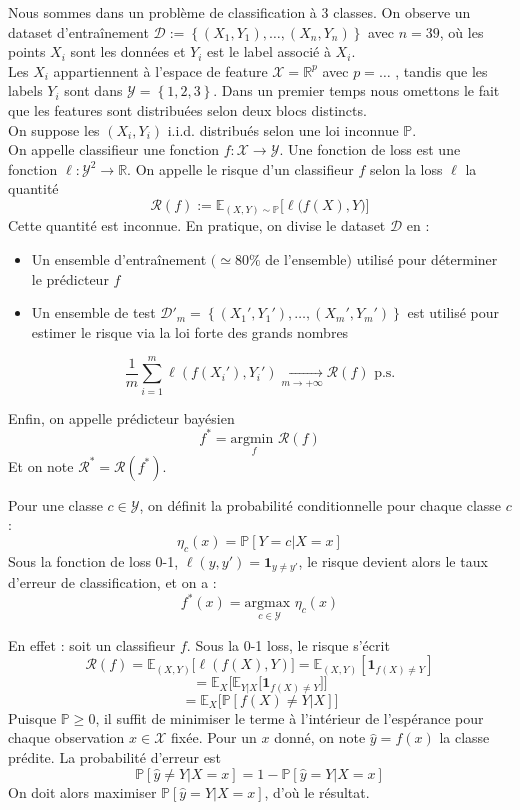 \documentclass[a4paper,11pt]{paper}
\theoremstyle{plain}
\theoremstyle{definition}
\theoremstyle{remark}
\begin{document}
Nous sommes dans un problème de classification à 3 classes. On observe un dataset d'entraînement $\mathcal{D} := \left\{ (X_1, Y_1), \dots, (X_n, Y_n)\right\}$ avec $n = 39$, où les points $X_i$ sont les données et $Y_i$ est le label associé à $X_i$. \\ Les $X_i$ appartiennent à l'espace de feature $\mathcal X = \mathbb R^p$ avec $p = \dots $ , tandis que les labels $Y_i$ sont dans $\mathcal Y = \left\{1, 2, 3\right\}$. Dans un premier temps nous omettons le fait que les features sont distribuées selon deux blocs distincts. \\
On suppose les $(X_i, Y_i)$ i.i.d. distribués selon une loi inconnue $\mathbb P$. \\
On appelle classifieur une fonction $f  : \mathcal X \to \mathcal Y$. Une fonction de loss est une fonction $\ell : \mathcal Y^2 \to \mathbb R$. On appelle le risque d'un classifieur $f$ selon la loss $\ell$ la quantité
$$\mathcal R(f) := \mathbb E_{(X, Y) \sim \mathbb P} \big[ \ell \big(f(X), Y\big)\big]$$
Cette quantité est inconnue. En pratique, on divise le dataset $\mathcal D$ en :
\begin{itemize}
    \item Un ensemble d'entraînement $(\simeq 80\%$ de l'ensemble$)$ utilisé pour déterminer le prédicteur $f$
    \item Un ensemble de test $\mathcal{D}'_m = \left\{ (X_1', Y_1'), \dots, (X_m', Y_m')\right\}$ est utilisé pour estimer le risque via la loi forte des grands nombres
\end{itemize}
$$\dfrac{1}{m}\sum_{i=1}^m\ell(f(X_i'), Y_i') \underset{m \to +\infty }{\longrightarrow} \mathcal{R}(f) \text{ p.s.}$$

Enfin, on appelle prédicteur bayésien
$$f^* = \underset{f}{\text{argmin }} \mathcal R(f)$$
Et on note $\mathcal R^* = \mathcal R(f^*)$.

Pour une classe $c \in \mathcal Y$, on définit la probabilité conditionnelle pour chaque classe $c$ :
$$\eta_c(x)  = \mathbb P[Y = c |X = x]$$
Sous la fonction de loss 0-1, $\ell(y, y') = \mathbf 1_{y \ne y'}$, le risque devient alors le taux d'erreur de classification, et on a :
$$f^*(x) = \underset{c \in \mathcal Y}{\text{argmax }} \eta_c(x)$$

En effet : soit un classifieur $f$. Sous la 0-1 loss, le risque s'écrit
$$\mathcal R(f) = \mathbb E_{(X, Y)}\big[\ell(f(X), Y)\big] = \mathbb E_{(X, Y)}[\mathbf 1_{f(X) \ne Y}]$$
$$= \mathbb E_{X}\bigg[ \mathbb E _{Y | X} \big[ \mathbf 1_{f(X) \ne Y}\big] \bigg]$$
$$= \mathbb E_X \big[ \mathbb P [f(X) \ne Y | X ]\big]$$
Puisque $\mathbb P \geqslant 0$, il suffit de minimiser le terme à l'intérieur de l'espérance pour chaque observation $x \in \mathcal{X}$ fixée. Pour un $x$ donné, on note $\hat y = f(x)$ la classe prédite. La probabilité d'erreur est
$$\mathbb P[\hat y \ne Y | X = x] = 1 - \mathbb P[\hat y = Y | X = x]$$
On doit alors maximiser $\mathbb P[\hat y = Y | X = x]$, d'où le résultat.
\end{document}
